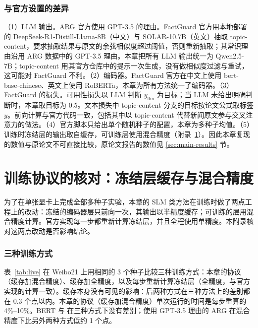 \subsubsection{与官方设置的差异}
（1）LLM 输出。ARG 官方使用 GPT-3.5 的理由。FactGuard 官方用本地部署的 DeepSeek-R1-Distill-Llama-8B（中文）与 SOLAR-10.7B（英文）抽取 topic-content，要求抽取结果与原文的余弦相似度超过阈值，否则重新抽取；其常识理由沿用 ARG 数据中的 GPT-3.5 理由\citep{he2026factguard}。本章把所有 LLM 输出统一为 Qwen2.5-7B；topic-content 用其官方仓库中的提示一次生成，没有做相似度过滤与重试，这可能对 FactGuard 不利。（2）编码器。FactGuard 官方在中文上使用 bert-base-chinese、英文上使用 RoBERTa，本章为所有方法统一了编码器。（3）FactGuard 的损失。可用性损失以 LLM 判断 $y_{\mathrm{llm}}$ 为目标；当 LLM 未给出明确判断时，本章取目标为 0.5。文本损失中 topic-content 分支的目标按论文公式取标签 $y$。前向计算与官方代码一致，包括其中以 topic-content 代替新闻原文参与交叉注意力的做法。（4）官方脚本只给出单个随机种子的配置，本章为多种子均值。（5）训练时冻结层的输出取自缓存，可训练层使用混合精度（附录~\ref{app:live}）。因此本章复现的数值与原论文不可直接比较，原论文报告的数值见 \ref{sec:main-results} 节。

\section{训练协议的核对：冻结层缓存与混合精度}\label{app:live}

为了在单张显卡上完成全部多种子实验，本章的 SLM 类方法在训练时做了两点工程上的改动：冻结的编码器层只前向一次，其输出以半精度缓存；可训练的层用混合精度计算。官方实现每一步都重新计算冻结层，并且全程使用单精度。本附录核对这两点改动是否影响结论。

\subsubsection{三种训练方式}
表~\ref{tab:live} 在 Weibo21 上用相同的 3 个种子比较三种训练方式：本章的协议（缓存加混合精度）、缓存加全精度，以及每步重新计算冻结层（全精度，与官方实现的计算一致）。缓存本身没有可见的影响：后两种方式在三种方法上的差别都在 0.3 个点以内。本章的协议（缓存加混合精度）单次运行的时间是每步重算的 4\%--10\%。BERT 与 \method{} 在三种方式下没有差别；使用 GPT-3.5 理由的 ARG 在混合精度下比另外两种方式低约 1 个点。

\begin{table}[htbp]
\centering\small
\caption{三种训练方式的对比（Weibo21，3 个种子）}\label{tab:live}
\end{table}

